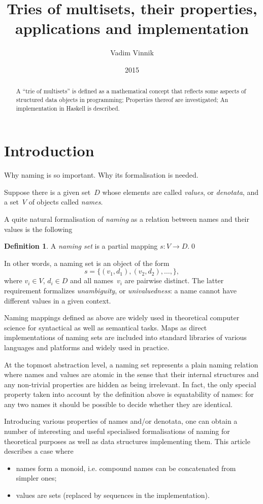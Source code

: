 \documentclass{article}
\title{Tries of multisets, their properties, applications and implementation}
\author{Vadim Vinnik}
\date{2015}
\theoremstyle{definition}
\newtheorem{Df}{Definition}
\begin{document}
\maketitle

\begin{abstract}
A ``trie of multisets'' is defined as a mathematical concept that
reflects some aspects of structured data objects in programming;
Properties thereof are investigated; An implementation in Haskell
is described.
\end{abstract}

\tableofcontents

\section{Introduction}

Why naming is so important. Why its formalisation is needed.

Suppose there is a given set~$D$ whose elements are called \emph{values}, or
\emph{denotata}, and a set~$V$ of objects called \emph{names}.

A quite natural formalisation of \emph{naming} as a relation between names and
their values is the following
\begin{Df}
A \emph{naming set} is a partial mapping $s: V\to D$.\qed
\end{Df}

In other words, a naming set is an object of the form
\[
  s = \{ (v_1, d_1), (v_2, d_2), \ldots, \} ,
\]
where $v_i\in V$, $d_i\in D$ and all names~$v_i$ are pairwise distinct. The
latter requirement formalizes \emph{unambiguity}, or \emph{univaluedness}: a
name cannot have different values in a given context.

Naming mappings defined as above are widely used in theoretical computer
science for syntactical as well as semantical tasks. Maps as direct
implementations of naming sets are included into standard libraries of various
languages and platforms and widely used in practice.

At the topmost abstraction level, a naming set represents a plain naming
relation where names and values are atomic in the sense that their internal
structures and any non-trivial properties are hidden as being irrelevant. In
fact, the only special property taken into account by the definition above is
equatability of names: for any two names it should be possible to decide
whether they are identical.

Introducing various properties of names and/or denotata, one can obtain a
number of interesting and useful specialised formalisations of naming for
theoretical purposes as well as data structures implementing them.
This article describes a case where
\begin{itemize}
\item names form a monoid, i.e. compound names can be concatenated from
simpler ones;
\item values are sets (replaced by sequences in the implementation).
\end{itemize}
\end{document}
